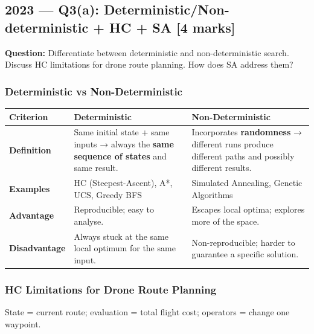 \documentclass[12pt, a4paper]{article}
\newenvironment{solutionbox}{\begin{mdframed}[style=solutionframe]}{\end{mdframed}}
\begin{document}
\subsection{2023 — Q3(a): Deterministic/Non-deterministic + HC + SA [4 marks]}

\begin{solutionbox}
\textbf{Question:} Differentiate between deterministic and non-deterministic search. Discuss HC limitations for drone route planning. How does SA address them?
\end{solutionbox}

\subsubsection*{Deterministic vs Non-Deterministic}

\begin{center}
\renewcommand{\arraystretch}{1.4}
\small
\begin{tabular}{l|p{6cm}|p{6cm}}
\toprule
\textbf{Criterion} & \textbf{Deterministic} & \textbf{Non-Deterministic} \\
\midrule
\textbf{Definition} & Same initial state + same inputs → always the \textbf{same sequence of states} and same result. & Incorporates \textbf{randomness} → different runs produce different paths and possibly different results. \\
\midrule
\textbf{Examples} & HC (Steepest-Ascent), A*, UCS, Greedy BFS & Simulated Annealing, Genetic Algorithms \\
\midrule
\textbf{Advantage} & Reproducible; easy to analyse. & Escapes local optima; explores more of the space. \\
\midrule
\textbf{Disadvantage} & Always stuck at the same local optimum for the same input. & Non-reproducible; harder to guarantee a specific solution. \\
\bottomrule
\end{tabular}
\end{center}

\subsubsection*{HC Limitations for Drone Route Planning}

State = current route; evaluation = total flight cost; operators = change one waypoint.
\end{document}

